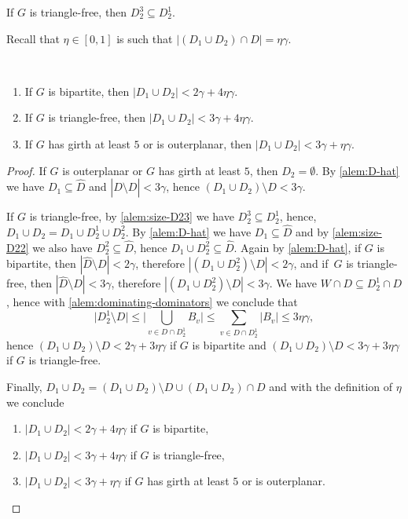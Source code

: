 \begin{lemma}\label{alem:size-D23}
  If $G$ is triangle-free, then $D_2^3\subseteq D_2^1$.
\end{lemma}

Recall that $\eta\in [0,1]$ is such that $|(D_1 \cup D_2)\cap D| =\eta\gamma$.

\begin{lemma}\label{alem:size-D12}
\mbox{ }
\vspace{-1mm}
\begin{enumerate}
\item If $G$ is bipartite, then $|D_1\cup D_2| < 2\gamma+4\eta\gamma$.
\item If $G$ is triangle-free, then $|D_1\cup D_2| < 3\gamma+4\eta\gamma$.
\item If $G$ has girth at least $5$ or is outerplanar, then $|D_1\cup D_2| < 3\gamma+\eta\gamma$.
\end{enumerate}
\end{lemma}
\begin{proof}
If $G$ is outerplanar or $G$ has girth at least $5$, then $D_2=\emptyset$.
By \cref{alem:D-hat} we have $D_1\subseteq \hat{D}$ and
$|\hat{D}\setminus D|<3\gamma$, hence $(D_1\cup D_2)\setminus D<3\gamma$.

If $G$ is triangle-free, by \cref{alem:size-D23} we have $D_2^3\subseteq D_2^1$, hence,
  $D_1\cup D_2=D_1\cup D_2^1\cup D_2^2$. By \cref{alem:D-hat} we have
  $D_1 \subseteq \hat D$ and by \cref{alem:size-D22} we also have
  $D_2^2 \subseteq \hat D$, hence $D_1\cup D_2^2\subseteq \hat D$.
  Again by \cref{alem:D-hat}, if $G$ is bipartite, then
  $|\hat D \setminus D|<2\gamma$, therefore $|(D_1 \cup D_2^2 )\setminus D| < 2\gamma$, and if~$G$ is triangle-free,
  then $|\hat D \setminus D|<3\gamma$,
  therefore $|(D_1 \cup D_2^2 )\setminus D| < 3\gamma$.
  We have $W\cap D\subseteq D_2^1\cap D$, hence with
  \cref{alem:dominating-dominators} we conclude that
  \[
    \big\vert D_2^1 \setminus D \big\vert \leq
    \Big\vert\bigcup\limits_{v\in D \cap D_2^1}B_v\Big\vert \leq
    \sum\limits_{v\in D \cap D_2^1} |B_v| \leq 3\eta\gamma,
  \]
  hence $(D_1\cup D_2)\setminus D<2\gamma+3\eta\gamma$ if
  $G$ is bipartite and $(D_1\cup D_2)\setminus D<3\gamma+3\eta\gamma$
  if $G$ is triangle-free.

  Finally,
  $D_1\cup D_2=(D_1\cup D_2)\setminus D\cup (D_1\cup D_2)\cap D$ and
  with the definition of $\eta$ we conclude

  \vspace{-2mm}
  \begin{enumerate}
  \item $|D_1\cup D_2|<2\gamma + 4\eta\gamma$ if $G$ is bipartite, 
  \item $|D_1\cup D_2|<3\gamma + 4\eta\gamma$ if $G$ is triangle-free, 
  \item $|D_1\cup D_2|<3\gamma + \eta\gamma$ if $G$ has girth at least
  $5$ or is outerplanar.
  \end{enumerate}

\end{proof}

